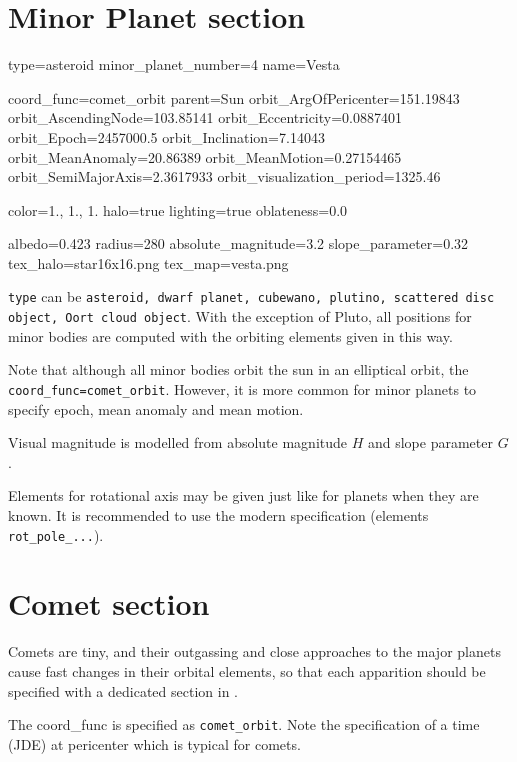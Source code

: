 \section{Minor Planet section}
\label{sec:ssystem.ini:MinorPlanet}

\begin{configfile}
[4vesta]
type=asteroid  
minor_planet_number=4
name=Vesta

coord_func=comet_orbit
parent=Sun
orbit_ArgOfPericenter=151.19843
orbit_AscendingNode=103.85141
orbit_Eccentricity=0.0887401
orbit_Epoch=2457000.5
orbit_Inclination=7.14043
orbit_MeanAnomaly=20.86389
orbit_MeanMotion=0.27154465
orbit_SemiMajorAxis=2.3617933
orbit_visualization_period=1325.46

color=1., 1., 1.
halo=true
lighting=true
oblateness=0.0

albedo=0.423
radius=280
absolute_magnitude=3.2
slope_parameter=0.32
tex_halo=star16x16.png
tex_map=vesta.png
\end{configfile}

\texttt{type} can be \texttt{asteroid, dwarf planet, cubewano,
  plutino, scattered disc object, Oort cloud object}. With the
exception of Pluto, all positions for minor bodies are computed with
the orbiting elements given in this way. 

Note that although all minor bodies orbit the sun in an
elliptical orbit, the \texttt{coord\_func=comet\_orbit}. However, it
is more common for minor planets to specify epoch, mean anomaly and
mean motion.

Visual magnitude is modelled from absolute magnitude $H$ and slope parameter $G$.

Elements for rotational axis may be given just like for planets when
they are known. It is recommended to use the modern specification
(elements \texttt{rot\_pole\_...}).

\section{Comet section}
\label{sec:ssystem.ini:Comet}

Comets are tiny, and their outgassing and close approaches to the
major planets cause fast changes in their orbital elements, so that
each apparition should be specified with a dedicated section in
. 

The coord\_func is specified as \texttt{comet\_orbit}.  Note the
specification of a time (JDE) at pericenter which is typical for
comets.

